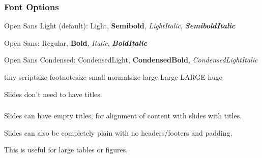 \documentclass[
	aspectratio=169, %
	12pt, %
	t, %
]{beamer}
\begin{document}

\begin{frame}
	\frametitle{Font Options}

	Open Sans Light (default): Light, \textbf{Semibold}, \textit{LightItalic}, \textbf{\textit{SemiboldItalic}}

	\medskip

	Open Sans: {\OpenSans Regular, \textbf{Bold}, \textit{Italic}, \textbf{\textit{BoldItalic}}}

	\medskip

	Open Sans Condensed: {\OpenSansCondensed CondensedLight, \textbf{CondensedBold}, \textit{CondensedLightItalic}}

	\bigskip

	{\tiny tiny} {\scriptsize scriptsize} {\footnotesize footnotesize} {\small small} {\normalsize normalsize} {\large large} {\Large Large} {\LARGE LARGE} {\huge huge}
\end{frame}


\begin{frame}
	Slides don't need to have titles.
\end{frame}


\begin{frame}
	\frametitle{\empty} %

	Slides can have empty titles, for alignment of content with slides with titles.
\end{frame}


\begin{frame}[plain]
	Slides can also be completely plain with no headers/footers and padding.

	\bigskip

	This is useful for large tables or figures.
\end{frame}
\end{document}
